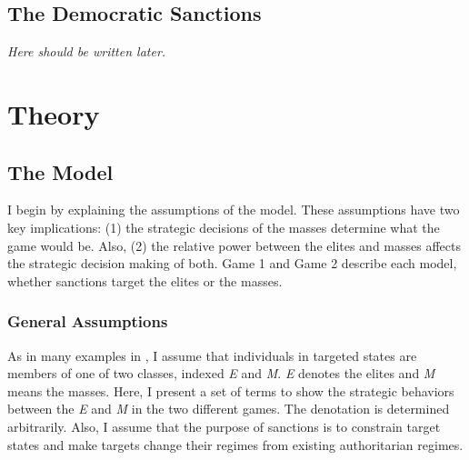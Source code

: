 \documentclass[11pt]{article}
\begin{document}
\subsection*{The Democratic Sanctions}
\textit{Here should be written later.}

\section*{Theory}
\subsection*{The Model}
I begin by explaining the assumptions of the model. These assumptions have two key implications: (1) the strategic decisions of the masses determine what the game would be. Also, (2) the relative power between the elites and masses affects the strategic decision making of both. Game 1 and Game 2 describe each model, whether sanctions target the elites or the masses.
	
\subsubsection*{General Assumptions}
As in many examples in \citet{Acemoglu2006a}, I assume that individuals in targeted states are members of one of two classes, indexed \textit{E} and \textit{M}. \textit{E} denotes the elites and \textit{M} means the masses. Here, I present a set of terms to show the strategic behaviors between the \textit{E} and \textit{M} in the two different games. The denotation is determined arbitrarily. Also, I assume that the purpose of sanctions is to constrain target states and make targets change their regimes from existing authoritarian regimes.
	
\end{document}
